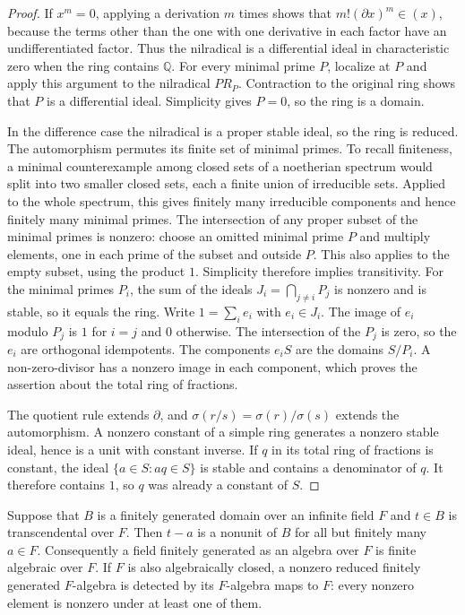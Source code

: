\begin{proof}
If \(x^m=0\), applying a derivation \(m\) times shows that
\(m!(\partial x)^m\in(x)\), because the terms other than the one
with one derivative in each factor have an undifferentiated factor.
Thus the nilradical is a differential ideal in characteristic zero
when the ring contains \(\mathbb Q\). For every minimal prime \(P\),
localize at \(P\) and apply this argument to the nilradical \(PR_P\).
Contraction to the original ring shows that \(P\) is a differential
ideal. Simplicity gives \(P=0\), so the ring is a domain.

In the difference case the nilradical is a proper stable ideal, so
the ring is reduced. The automorphism permutes its finite set of
minimal primes. To recall finiteness, a minimal counterexample
among closed sets of a noetherian spectrum would split into two
smaller closed sets, each a finite union of irreducible sets.
Applied to the whole spectrum, this gives finitely many
irreducible components and hence finitely many minimal primes.
The intersection of any proper subset of the
minimal primes is nonzero: choose an omitted minimal prime \(P\)
and multiply elements, one in each prime of the subset and outside
\(P\). This also applies to the empty subset, using the product \(1\).
Simplicity therefore implies transitivity. For the minimal primes
\(P_i\), the sum of the ideals \(J_i=\bigcap_{j\ne i}P_j\) is nonzero
and is stable, so it equals the ring. Write \(1=\sum_i e_i\) with
\(e_i\in J_i\). The image of \(e_i\) modulo \(P_j\) is \(1\) for
\(i=j\) and \(0\) otherwise. The intersection of the \(P_j\) is zero,
so the \(e_i\) are orthogonal idempotents. The components \(e_iS\)
are the domains \(S/P_i\). A non-zero-divisor has a nonzero image
in each component, which proves the assertion about the total
ring of fractions.

The quotient rule extends \(\partial\), and
\(\sigma(r/s)=\sigma(r)/\sigma(s)\) extends the automorphism.
A nonzero constant of a simple ring generates a nonzero stable
ideal, hence is a unit with constant inverse. If \(q\) in its total
ring of fractions is constant, the ideal
\(\{a\in S:aq\in S\}\) is stable and contains a denominator of \(q\).
It therefore contains \(1\), so \(q\) was already a constant of \(S\).
\end{proof}

\begin{lemma}
\label{res:PV04}
Suppose that \(B\) is a finitely generated domain over an infinite
field \(F\) and \(t\in B\) is transcendental over \(F\).
Then \(t-a\) is a nonunit of \(B\) for all but finitely many \(a\in F\).
Consequently a field finitely generated as an algebra over \(F\)
is finite algebraic over \(F\). If \(F\) is also algebraically
closed, a nonzero reduced finitely generated \(F\)-algebra
is detected by its \(F\)-algebra maps to \(F\): every nonzero
element is nonzero under at least one of them.
\end{lemma}

